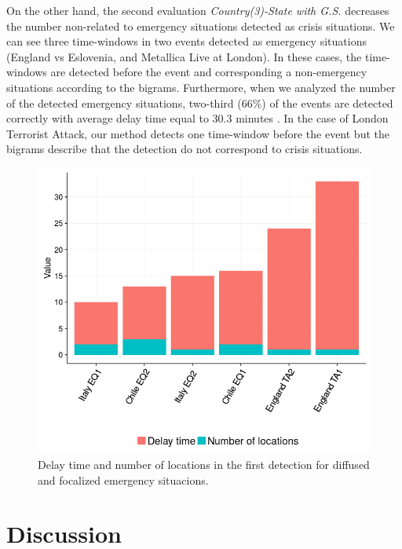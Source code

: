 \documentclass[sigconf]{acmart}
\begin{document}
On the other hand, the second evaluation \textit{Country(3)-State with G.S.} decreases the number non-related to emergency situations detected as crisis situations. We can see three time-windows in two events detected as emergency situations (England vs Eslovenia, and Metallica Live at London). In these cases, the time-windows are detected before the event and corresponding a non-emergency situations according to the bigrams. Furthermore, when we analyzed the number of the detected emergency situations, two-third ($66\%$) of the events are detected correctly with average delay time equal to $30.3$ minutes . In the case of London Terrorist Attack, our method detects one time-window before the event but the bigrams describe that the detection do not correspond to crisis situations.



\begin{figure}
	\centering
	\includegraphics[width=\columnwidth]{img/delay.png}
	\caption{Delay time and number of locations in the first detection for diffused and focalized emergency situacions.}
	\label{fig:delay}
\end{figure}

\section{Discussion}
\end{document}
